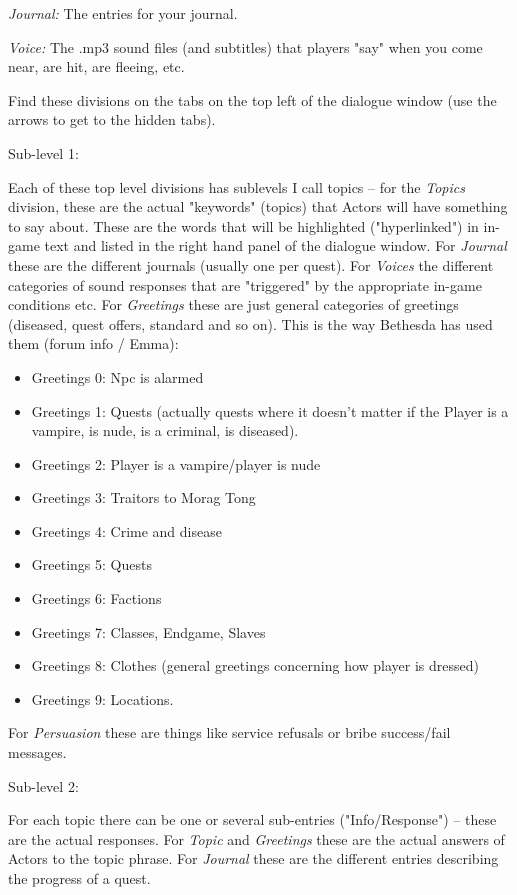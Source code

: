 \emph{Journal:} The entries for your journal.

\emph{Voice:} The .mp3 sound files (and subtitles) that players "say"
when you come near, are hit, are fleeing, etc.

Find these divisions on the tabs on the top left of the dialogue window
(use the arrows to get to the hidden tabs).

Sub-level 1:

Each of these top level divisions has sublevels I call topics -- for the
\emph{Topics} division, these are the actual "keywords" (topics) that
Actors will have something to say about. These are the words that will
be highlighted ("hyperlinked") in in-game text and listed in the right
hand panel of the dialogue window. For \emph{Journal} these are the
different journals (usually one per quest). For \emph{Voices} the
different categories of sound responses that are "triggered" by the
appropriate in-game conditions etc. For \emph{Greetings} these are just
general categories of greetings (diseased, quest offers, standard and so
on). This is the way Bethesda has used them (forum info / Emma):

\begin{itemize}
\item
  Greetings 0: Npc is alarmed
\item
  Greetings 1: Quests (actually quests where it doesn't matter if the
  Player is a vampire, is nude, is a criminal, is diseased).
\item
  Greetings 2: Player is a vampire/player is nude
\item
  Greetings 3: Traitors to Morag Tong
\item
  Greetings 4: Crime and disease
\item
  Greetings 5: Quests
\item
  Greetings 6: Factions
\item
  Greetings 7: Classes, Endgame, Slaves
\item
  Greetings 8: Clothes (general greetings concerning how player is
  dressed)
\item
  Greetings 9: Locations.
\end{itemize}

For \emph{Persuasion} these are things like service refusals or bribe
success/fail messages.

Sub-level 2:

For each topic there can be one or several sub-entries ("Info/Response")
-- these are the actual responses. For \emph{Topic} and \emph{Greetings}
these are the actual answers of Actors to the topic phrase. For
\emph{Journal} these are the different entries describing the progress
of a quest.

